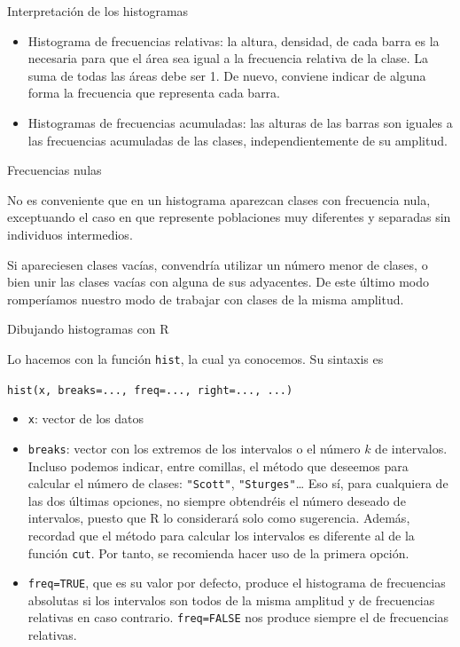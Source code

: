 \documentclass[
  ignorenonframetext,
]{beamer}
\providecommand{\tightlist}{%
  \setlength{\itemsep}{0pt}\setlength{\parskip}{0pt}}
\begin{document}
\begin{frame}{Interpretación de los histogramas}
\protect\hypertarget{interpretaciuxf3n-de-los-histogramas-2}{}

\begin{itemize}
\tightlist
\item
  Histograma de frecuencias relativas: la altura, densidad, de cada
  barra es la necesaria para que el área sea igual a la frecuencia
  relativa de la clase. La suma de todas las áreas debe ser 1. De nuevo,
  conviene indicar de alguna forma la frecuencia que representa cada
  barra.
\item
  Histogramas de frecuencias acumuladas: las alturas de las barras son
  iguales a las frecuencias acumuladas de las clases, independientemente
  de su amplitud.
\end{itemize}

\end{frame}

\begin{frame}{Frecuencias nulas}
\protect\hypertarget{frecuencias-nulas}{}

No es conveniente que en un histograma aparezcan clases con frecuencia
nula, exceptuando el caso en que represente poblaciones muy diferentes y
separadas sin individuos intermedios.

Si apareciesen clases vacías, convendría utilizar un número menor de
clases, o bien unir las clases vacías con alguna de sus adyacentes. De
este último modo romperíamos nuestro modo de trabajar con clases de la
misma amplitud.

\end{frame}

\begin{frame}[fragile]{Dibujando histogramas con R}
\protect\hypertarget{dibujando-histogramas-con-r}{}

Lo hacemos con la función \texttt{hist}, la cual ya conocemos. Su
sintaxis es

\texttt{hist(x,\ breaks=...,\ freq=...,\ right=...,\ ...)}

\begin{itemize}
\tightlist
\item
  \texttt{x}: vector de los datos
\item
  \texttt{breaks}: vector con los extremos de los intervalos o el número
  \(k\) de intervalos. Incluso podemos indicar, entre comillas, el
  método que deseemos para calcular el número de clases:
  \texttt{"Scott"}, \texttt{"Sturges"}\ldots{} Eso sí, para cualquiera
  de las dos últimas opciones, no siempre obtendréis el número deseado
  de intervalos, puesto que R lo considerará solo como sugerencia.
  Además, recordad que el método para calcular los intervalos es
  diferente al de la función \texttt{cut}. Por tanto, se recomienda
  hacer uso de la primera opción.
\item
  \texttt{freq=TRUE}, que es su valor por defecto, produce el histograma
  de frecuencias absolutas si los intervalos son todos de la misma
  amplitud y de frecuencias relativas en caso contrario.
  \texttt{freq=FALSE} nos produce siempre el de frecuencias relativas.
\end{itemize}

\end{frame}
\end{document}
